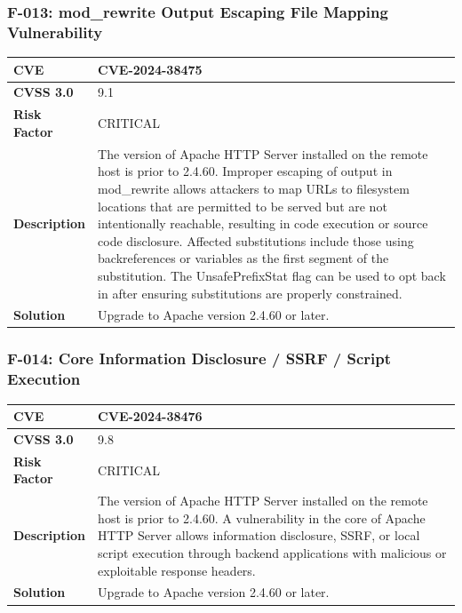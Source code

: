 \subsubsection{F-013: mod\_rewrite Output Escaping File Mapping Vulnerability}
\begin{tabular}{|p{2.8cm}|p{12.2cm}|}
\hline
\textbf{CVE} & CVE-2024-38475 \\ \hline
\textbf{CVSS 3.0} & 9.1 \\ \hline
\textbf{Risk Factor} & CRITICAL \\ \hline
\textbf{Description} & The version of Apache HTTP Server installed on the remote host is prior to 2.4.60. Improper escaping of output in mod\_rewrite allows attackers to map URLs to filesystem locations that are permitted to be served but are not intentionally reachable, resulting in code execution or source code disclosure. Affected substitutions include those using backreferences or variables as the first segment of the substitution. The UnsafePrefixStat flag can be used to opt back in after ensuring substitutions are properly constrained. \\ \hline
\textbf{Solution} & Upgrade to Apache version 2.4.60 or later. \\ \hline
\end{tabular}

\subsubsection{F-014: Core Information Disclosure / SSRF / Script Execution}
\begin{tabular}{|p{2.8cm}|p{12.2cm}|}
\hline
\textbf{CVE} & CVE-2024-38476 \\ \hline
\textbf{CVSS 3.0} & 9.8 \\ \hline
\textbf{Risk Factor} & CRITICAL \\ \hline
\textbf{Description} & The version of Apache HTTP Server installed on the remote host is prior to 2.4.60. A vulnerability in the core of Apache HTTP Server allows information disclosure, SSRF, or local script execution through backend applications with malicious or exploitable response headers. \\ \hline
\textbf{Solution} & Upgrade to Apache version 2.4.60 or later. \\ \hline
\end{tabular}

